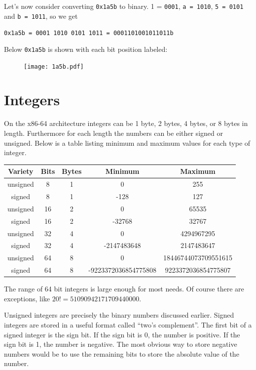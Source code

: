 \documentclass[11pt,b5paper]{book}
\begin{document}
Let's now consider converting {\tt 0x1a5b} to binary.
1 = {\tt 0001}, {\tt a = 1010}, {\tt 5 = 0101} and {\tt b = 1011}, so we get

\begin{center}
{\tt 0x1a5b = 0001 1010 0101 1011 = 0001101001011011b}
\end{center}

Below {\tt 0x1a5b} is shown with each bit position labeled:

\begin{figure}[h!]
\centering\texttt{[image: 1a5b.pdf]}
\end{figure}

\section{Integers}

On the x86-64 architecture integers can be 1 byte, 2 bytes, 4 bytes, or 8
bytes in length.
Furthermore for each length the numbers can be either signed or unsigned.
Below is a table listing minimum and maximum values for each type of integer.

\begin{center}
\begin{tabular}{|c|c|c|c|c|}
\hline
Variety & Bits & Bytes & Minimum & Maximum \\
\hline
unsigned & 8   & 1     & 0       & 255 \\
\hline
signed & 8     & 1     & -128    & 127 \\
\hline
unsigned & 16  & 2     & 0       & 65535 \\
\hline
signed & 16    & 2     & -32768  & 32767 \\
\hline
unsigned & 32  & 4     & 0       & 4294967295 \\
\hline
signed & 32    & 4     & -2147483648    & 2147483647 \\
\hline
unsigned & 64  & 8     & 0       & 18446744073709551615 \\
\hline
signed & 64    & 8     & -9223372036854775808    & 9223372036854775807 \\
\hline
\end{tabular}
\end{center}

The range of 64 bit integers is large enough for most needs.
Of course there are exceptions, like $20! = 51090942171709440000$.

Unsigned integers are precisely the binary numbers discussed earlier.
Signed integers are stored in a useful format called ``two's complement''.
The first bit of a signed integer is the sign bit.
If the sign bit is 0, the number is positive.
If the sign bit is 1, the number is negative.
The most obvious way to store negative numbers would be to use the remaining
bits to store the absolute value of the number.
\end{document}

